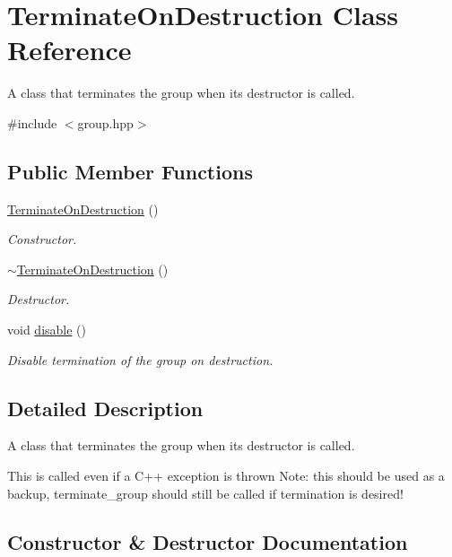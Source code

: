 \hypertarget{class_terminate_on_destruction}{}\section{Terminate\+On\+Destruction Class Reference}
\label{class_terminate_on_destruction}


A class that terminates the group when its destructor is called.  




{\ttfamily \#include $<$group.\+hpp$>$}

\subsection*{Public Member Functions}
\begin{DoxyCompactItemize}
\item 
\hyperlink{class_terminate_on_destruction_ac1b230c0858db2e39b83188eae7c5a8e}{Terminate\+On\+Destruction} ()
\begin{DoxyCompactList}\small\item\em Constructor. \end{DoxyCompactList}\item 
\hyperlink{class_terminate_on_destruction_a1e2e372004731b788bb9df84d618181f}{$\sim$\+Terminate\+On\+Destruction} ()
\begin{DoxyCompactList}\small\item\em Destructor. \end{DoxyCompactList}\item 
void \hyperlink{class_terminate_on_destruction_a3ee7e31e435328d6ff97edd5627f7c27}{disable} ()
\begin{DoxyCompactList}\small\item\em Disable termination of the group on destruction. \end{DoxyCompactList}\end{DoxyCompactItemize}


\subsection{Detailed Description}
A class that terminates the group when its destructor is called. 

This is called even if a C++ exception is thrown Note\+: this should be used as a backup, terminate\+\_\+group should still be called if termination is desired! 

\subsection{Constructor \& Destructor Documentation}
